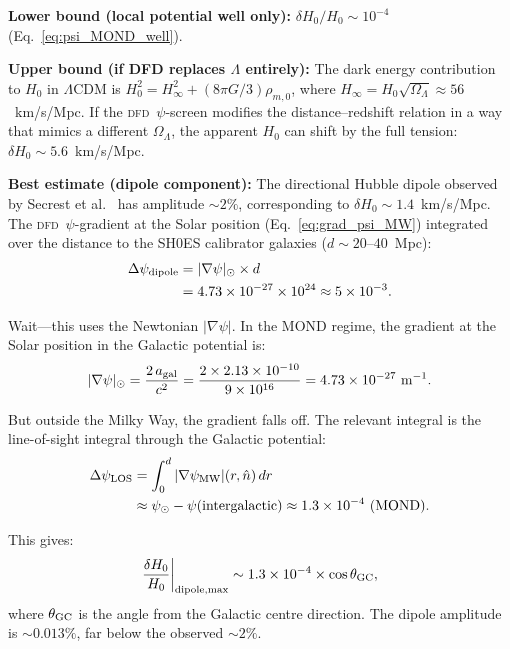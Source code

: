 \documentclass[aps,prl,twocolumn,superscriptaddress,showpacs]{revtex4-2}
\newcommand{\DFD}{\textsc{dfd}}
\begin{document}
\textbf{Lower bound (local potential well only):}
$\delta H_0/H_0 \sim 10^{-4}$ (Eq.~\ref{eq:psi_MOND_well}).

\textbf{Upper bound (if DFD replaces $\Lambda$ entirely):}
The dark energy contribution to $H_0$ in $\Lambda$CDM is
$H_0^2 = H_\infty^2 + (8\pi G/3)\rho_{m,0}$, where
$H_\infty = H_0\sqrt{\Omega_\Lambda} \approx 56$~km/s/Mpc.
If the \DFD\ $\psi$-screen modifies the distance--redshift
relation in a way that mimics a different $\Omega_\Lambda$,
the apparent $H_0$ can shift by the full tension:
$\delta H_0 \sim 5.6$~km/s/Mpc.

\textbf{Best estimate (dipole component):}
The directional Hubble dipole observed by Secrest et al.~\cite{Secrest2021}
has amplitude $\sim 2\%$, corresponding to $\delta H_0 \sim 1.4$~km/s/Mpc.
The \DFD\ $\psi$-gradient at the Solar position (Eq.~\ref{eq:grad_psi_MW})
integrated over the distance to the SH0ES calibrator galaxies
($d \sim 20$--$40$~Mpc):
\begin{align}
\Delta\psi_{\rm dipole} &= |\nabla\psi|_\odot \times d \nonumber\\
&= 4.73\times 10^{-27}\times 10^{24} \approx 5\times 10^{-3}.
\label{eq:dipole_psi}
\end{align}

Wait---this uses the Newtonian $|\nabla\psi|$.  In the MOND regime,
the gradient at the Solar position in the Galactic potential is:
\begin{equation}
|\nabla\psi|_\odot = \frac{2\,a_{\rm gal}}{c^2}
= \frac{2\times 2.13\times 10^{-10}}{9\times 10^{16}}
= 4.73\times 10^{-27}~\text{m}^{-1}.
\end{equation}

But outside the Milky Way, the gradient falls off.  The relevant
integral is the line-of-sight integral through the Galactic
potential:
\begin{align}
\Delta\psi_{\rm LOS} &= \int_0^d |\nabla\psi_{\rm MW}|(r,\hat{n})\,dr \nonumber\\
&\approx \psi_\odot - \psi(\text{intergalactic})
\approx 1.3\times 10^{-4}~\text{(MOND)}.
\end{align}

This gives:
\begin{equation}
\frac{\delta H_0}{H_0}\bigg|_{\rm dipole,max}
\sim 1.3\times 10^{-4}\times\cos\theta_{\rm GC},
\end{equation}
where $\theta_{\rm GC}$ is the angle from the Galactic centre
direction.  The dipole amplitude is $\sim 0.013\%$, far below
the observed $\sim 2\%$.
\end{document}
